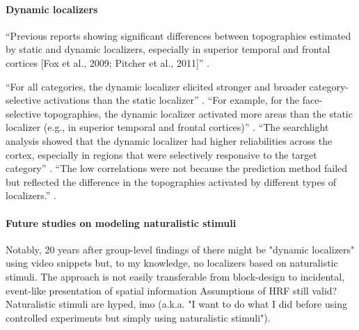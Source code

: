 \paragraph{Dynamic localizers}

``Previous reports showing significant differences between topographies
estimated by static and dynamic localizers, especially in superior temporal and
frontal cortices [Fox et al., 2009; Pitcher et al., 2011]''
\citep{jiahui2022cross}.

%
``For all categories, the dynamic localizer elicited stronger and broader
category-selective activations than the static localizer''
\citep{jiahui2022cross}.
%
``For example, for the face-selective topographies, the dynamic localizer
activated more areas than the static localizer (e.g., in superior temporal and
frontal cortices)'' \citep{jiahui2022cross}.
%
``The searchlight analysis showed that the dynamic localizer had higher
reliabilities across the cortex, especially in regions that were selectively
responsive to the target category'' \citep{jiahui2022cross}.
%
``The low correlations were not because the prediction method failed but
reflected the difference in the topographies activated by different types of
localizers.'' \citep{jiahui2022cross}.


\paragraph{Future studies on modeling naturalistic stimuli}





%
Notably, 20 years after group-level findings of \citep{bartels2004mapping} there
might be "dynamic localizers" using video snippets
\citep{pitcher2011differential, fox2009defining} but, to my knowledge, no
localizers based on naturalistic stimuli.
%
The approach is not easily transferable from block-design to incidental,
event-like presentation of spatial information
%
Assumptions of HRF still valid?
%
Naturalistic stimuli are hyped, imo (a.k.a. "I want to do what I did before
using controlled experiments but simply using naturalistic stimuli").


